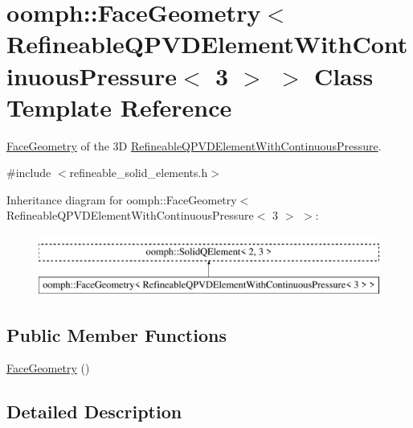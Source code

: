 \hypertarget{classoomph_1_1FaceGeometry_3_01RefineableQPVDElementWithContinuousPressure_3_013_01_4_01_4}{}\section{oomph\+:\+:Face\+Geometry$<$ Refineable\+Q\+P\+V\+D\+Element\+With\+Continuous\+Pressure$<$ 3 $>$ $>$ Class Template Reference}
\label{classoomph_1_1FaceGeometry_3_01RefineableQPVDElementWithContinuousPressure_3_013_01_4_01_4}


\hyperlink{classoomph_1_1FaceGeometry}{Face\+Geometry} of the 3D \hyperlink{classoomph_1_1RefineableQPVDElementWithContinuousPressure}{Refineable\+Q\+P\+V\+D\+Element\+With\+Continuous\+Pressure}.  




{\ttfamily \#include $<$refineable\+\_\+solid\+\_\+elements.\+h$>$}

Inheritance diagram for oomph\+:\+:Face\+Geometry$<$ Refineable\+Q\+P\+V\+D\+Element\+With\+Continuous\+Pressure$<$ 3 $>$ $>$\+:\begin{figure}[H]
\begin{center}
\leavevmode
\includegraphics[height=2.000000cm]{classoomph_1_1FaceGeometry_3_01RefineableQPVDElementWithContinuousPressure_3_013_01_4_01_4}
\end{center}
\end{figure}
\subsection*{Public Member Functions}
\begin{DoxyCompactItemize}
\item 
\hyperlink{classoomph_1_1FaceGeometry_3_01RefineableQPVDElementWithContinuousPressure_3_013_01_4_01_4_a375ca5e8a2873c320187ed915d46de50}{Face\+Geometry} ()
\end{DoxyCompactItemize}


\subsection{Detailed Description}
